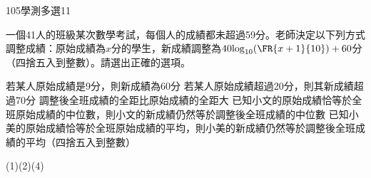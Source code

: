     \begin{QUESTION}
        \begin{ExamInfo}{105}{學測}{多選}{11}
        \end{ExamInfo}
        \begin{ExamAnsRateInfo}{47}{67}{49}{25}
        \end{ExamAnsRateInfo}
        \begin{QBODY}
            一個41人的班級某次數學考試，每個人的成績都未超過59分。老師決定以下列方式調整成績：原始成績為$x$分的學生，新成績調整為$40{{\log }_{10}}(\FR{x+1}{10})+60$分（四捨五入到整數）。請選出正確的選項。
			\begin{QOPS}
				\QOP 若某人原始成績是9分，則新成績為60分
				\QOP 若某人原始成績超過20分，則其新成績超過70分
				\QOP 調整後全班成績的全距比原始成績的全距大
				\QOP 已知小文的原始成績恰等於全班原始成績的中位數，則小文的新成績仍然等於調整後全班成績的中位數
				\QOP 已知小美的原始成績恰等於全班原始成績的平均，則小美的新成績仍然等於調整後全班成績的平均（四捨五入到整數）
			\end{QOPS}
        \end{QBODY}
        \begin{QFROMS}
        \end{QFROMS}
        \begin{QTAGS}\end{QTAGS}
        \begin{QANS}
            (1)(2)(4)
        \end{QANS}
        \begin{QSOLLIST}
        \end{QSOLLIST}
        \begin{QEMPTYSPACE}
        \end{QEMPTYSPACE}
    \end{QUESTION}
